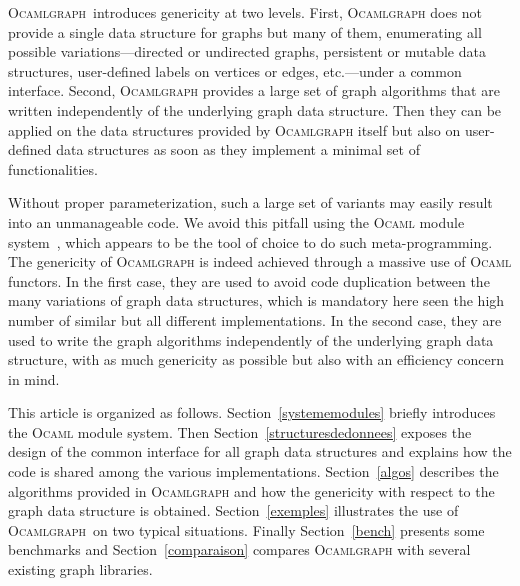 \documentclass[]{tfp05symp}
\newcommand{\ocamlgraph}{\textsc{Ocamlgraph}\xspace}
\newcommand{\ocaml}{\textsc{Ocaml}\xspace}
\begin{document}
\ocamlgraph\ introduces genericity at two levels. First, \ocamlgraph
does not provide a single data structure for graphs but many of them,
enumerating all possible variations---directed or undirected graphs,
persistent or mutable data structures, user-defined labels on vertices
or edges, etc.---under a common interface.
Second, \ocamlgraph provides a large set of graph algorithms that are
written independently of the underlying graph data structure. Then
they can be applied on the data structures provided by \ocamlgraph
itself but also on user-defined data structures as soon as they
implement a minimal set of functionalities.

Without proper parameterization, such a large set of variants may
easily result into an unmanageable code. We avoid this pitfall
using the \ocaml module system~\cite{leroy00}, which
appears to be the tool of choice to do such meta-programming. 
The genericity of \ocamlgraph is indeed achieved through a massive use
of \ocaml functors. In the first case, they are used to avoid code
duplication between the many variations of graph data structures,
which is mandatory here seen the high number of similar but all
different implementations. In the second case, they are used to write
the graph algorithms independently of the underlying graph data
structure, with as much genericity as possible but also with an
efficiency concern in mind. 

This article is organized as follows. Section~\ref{systememodules}
briefly introduces the \ocaml module system. Then
Section~\ref{structuresdedonnees} exposes the design of the common
interface for all graph data structures and explains how the code is
shared among the various implementations. Section~\ref{algos}
describes the algorithms provided in \ocamlgraph and how the
genericity with respect to the graph data structure is obtained.
Section~\ref{exemples} illustrates the use of \ocamlgraph\ on two
typical situations.  Finally Section~\ref{bench} presents some
benchmarks and Section~\ref{comparaison} compares \ocamlgraph with
several existing graph libraries.


\end{document}

